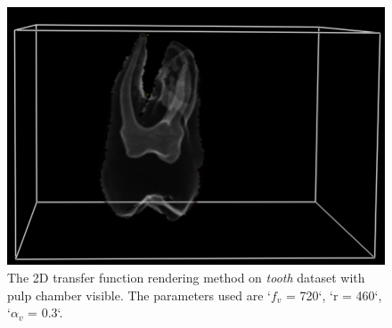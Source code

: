 \documentclass[a4paper]{article}
\begin{document}
\begin{figure}[h]
  \centering
  \includegraphics[width=\textwidth]{tooth-2d}
  \caption{The 2D transfer function rendering method on \textit{tooth} dataset with pulp chamber visible. The parameters used are `$f_v$ = 720`, `r = 460`, `$\alpha_v$ = 0.3`.}
  \label{fig:tooth}
\end{figure}
\end{document}

